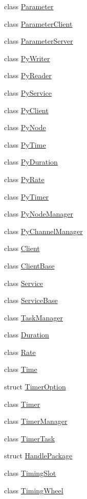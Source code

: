 \begin{DoxyCompactItemize}
\item 
class \hyperlink{classapollo_1_1cyber_1_1Parameter}{Parameter}
\item 
class \hyperlink{classapollo_1_1cyber_1_1ParameterClient}{Parameter\-Client}
\item 
class \hyperlink{classapollo_1_1cyber_1_1ParameterServer}{Parameter\-Server}
\item 
class \hyperlink{classapollo_1_1cyber_1_1PyWriter}{Py\-Writer}
\item 
class \hyperlink{classapollo_1_1cyber_1_1PyReader}{Py\-Reader}
\item 
class \hyperlink{classapollo_1_1cyber_1_1PyService}{Py\-Service}
\item 
class \hyperlink{classapollo_1_1cyber_1_1PyClient}{Py\-Client}
\item 
class \hyperlink{classapollo_1_1cyber_1_1PyNode}{Py\-Node}
\item 
class \hyperlink{classapollo_1_1cyber_1_1PyTime}{Py\-Time}
\item 
class \hyperlink{classapollo_1_1cyber_1_1PyDuration}{Py\-Duration}
\item 
class \hyperlink{classapollo_1_1cyber_1_1PyRate}{Py\-Rate}
\item 
class \hyperlink{classapollo_1_1cyber_1_1PyTimer}{Py\-Timer}
\item 
class \hyperlink{classapollo_1_1cyber_1_1PyNodeManager}{Py\-Node\-Manager}
\item 
class \hyperlink{classapollo_1_1cyber_1_1PyChannelManager}{Py\-Channel\-Manager}
\item 
class \hyperlink{classapollo_1_1cyber_1_1Client}{Client}
\item 
class \hyperlink{classapollo_1_1cyber_1_1ClientBase}{Client\-Base}
\item 
class \hyperlink{classapollo_1_1cyber_1_1Service}{Service}
\item 
class \hyperlink{classapollo_1_1cyber_1_1ServiceBase}{Service\-Base}
\item 
class \hyperlink{classapollo_1_1cyber_1_1TaskManager}{Task\-Manager}
\item 
class \hyperlink{classapollo_1_1cyber_1_1Duration}{Duration}
\item 
class \hyperlink{classapollo_1_1cyber_1_1Rate}{Rate}
\item 
class \hyperlink{classapollo_1_1cyber_1_1Time}{Time}
\item 
struct \hyperlink{structapollo_1_1cyber_1_1TimerOption}{Timer\-Option}
\item 
class \hyperlink{classapollo_1_1cyber_1_1Timer}{Timer}
\item 
class \hyperlink{classapollo_1_1cyber_1_1TimerManager}{Timer\-Manager}
\item 
class \hyperlink{classapollo_1_1cyber_1_1TimerTask}{Timer\-Task}
\item 
struct \hyperlink{structapollo_1_1cyber_1_1HandlePackage}{Handle\-Package}
\item 
class \hyperlink{classapollo_1_1cyber_1_1TimingSlot}{Timing\-Slot}
\item 
class \hyperlink{classapollo_1_1cyber_1_1TimingWheel}{Timing\-Wheel}
\end{DoxyCompactItemize}

